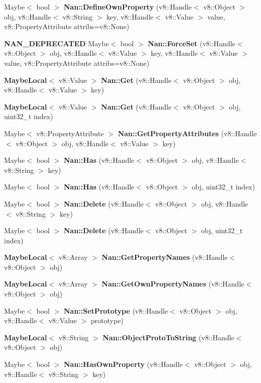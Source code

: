\begin{DoxyCompactItemize}
Maybe$<$ bool $>$ \textbf{ Nan\+::\+Define\+Own\+Property} (v8\+::\+Handle$<$ v8\+::\+Object $>$ obj, v8\+::\+Handle$<$ v8\+::\+String $>$ key, v8\+::\+Handle$<$ v8\+::\+Value $>$ value, v8\+::\+Property\+Attribute attribs=v8\+::\+None)
\item 
\textbf{ N\+A\+N\+\_\+\+D\+E\+P\+R\+E\+C\+A\+T\+ED} Maybe$<$ bool $>$ \textbf{ Nan\+::\+Force\+Set} (v8\+::\+Handle$<$ v8\+::\+Object $>$ obj, v8\+::\+Handle$<$ v8\+::\+Value $>$ key, v8\+::\+Handle$<$ v8\+::\+Value $>$ value, v8\+::\+Property\+Attribute attribs=v8\+::\+None)
\item 
\textbf{ Maybe\+Local}$<$ v8\+::\+Value $>$ \textbf{ Nan\+::\+Get} (v8\+::\+Handle$<$ v8\+::\+Object $>$ obj, v8\+::\+Handle$<$ v8\+::\+Value $>$ key)
\item 
\textbf{ Maybe\+Local}$<$ v8\+::\+Value $>$ \textbf{ Nan\+::\+Get} (v8\+::\+Handle$<$ v8\+::\+Object $>$ obj, uint32\+\_\+t index)
\item 
Maybe$<$ v8\+::\+Property\+Attribute $>$ \textbf{ Nan\+::\+Get\+Property\+Attributes} (v8\+::\+Handle$<$ v8\+::\+Object $>$ obj, v8\+::\+Handle$<$ v8\+::\+Value $>$ key)
\item 
Maybe$<$ bool $>$ \textbf{ Nan\+::\+Has} (v8\+::\+Handle$<$ v8\+::\+Object $>$ obj, v8\+::\+Handle$<$ v8\+::\+String $>$ key)
\item 
Maybe$<$ bool $>$ \textbf{ Nan\+::\+Has} (v8\+::\+Handle$<$ v8\+::\+Object $>$ obj, uint32\+\_\+t index)
\item 
Maybe$<$ bool $>$ \textbf{ Nan\+::\+Delete} (v8\+::\+Handle$<$ v8\+::\+Object $>$ obj, v8\+::\+Handle$<$ v8\+::\+String $>$ key)
\item 
Maybe$<$ bool $>$ \textbf{ Nan\+::\+Delete} (v8\+::\+Handle$<$ v8\+::\+Object $>$ obj, uint32\+\_\+t index)
\item 
\textbf{ Maybe\+Local}$<$ v8\+::\+Array $>$ \textbf{ Nan\+::\+Get\+Property\+Names} (v8\+::\+Handle$<$ v8\+::\+Object $>$ obj)
\item 
\textbf{ Maybe\+Local}$<$ v8\+::\+Array $>$ \textbf{ Nan\+::\+Get\+Own\+Property\+Names} (v8\+::\+Handle$<$ v8\+::\+Object $>$ obj)
\item 
Maybe$<$ bool $>$ \textbf{ Nan\+::\+Set\+Prototype} (v8\+::\+Handle$<$ v8\+::\+Object $>$ obj, v8\+::\+Handle$<$ v8\+::\+Value $>$ prototype)
\item 
\textbf{ Maybe\+Local}$<$ v8\+::\+String $>$ \textbf{ Nan\+::\+Object\+Proto\+To\+String} (v8\+::\+Handle$<$ v8\+::\+Object $>$ obj)
\item 
Maybe$<$ bool $>$ \textbf{ Nan\+::\+Has\+Own\+Property} (v8\+::\+Handle$<$ v8\+::\+Object $>$ obj, v8\+::\+Handle$<$ v8\+::\+String $>$ key)

\end{DoxyCompactItemize}

